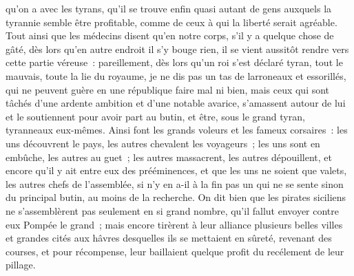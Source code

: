 \documentclass[french,twoside]{book} %
\begin{document}
qu’on a avec les tyrans, qu’il se trouve enfin quasi autant de gens auxquels la tyrannie semble être profitable, comme de ceux à qui la liberté serait agréable. Tout ainsi que les médecins disent qu’en notre corps, s’il y a quelque chose de gâté, dès lors qu’en autre endroit il s’y bouge rien, il se vient aussitôt rendre vers cette partie véreuse : pareillement, dès lors qu’un roi s’est déclaré tyran, tout le mauvais, toute la lie du royaume, je ne dis pas un tas de larroneaux et essorillés, qui ne peuvent guère en une république faire mal ni bien, mais ceux qui sont tâchés d’une ardente ambition et d’une notable avarice, s’amassent autour de lui et le soutiennent pour avoir part au butin, et être, sous le grand tyran, tyranneaux eux-mêmes. Ainsi font les grands voleurs et les fameux corsaires : les uns découvrent le pays, les autres chevalent les voyageurs ; les uns sont en embûche, les autres au guet ; les autres massacrent, les autres dépouillent, et encore qu’il y ait entre eux des prééminences, et que les uns ne soient que valets, les autres chefs de l’assemblée, si n’y en a-il à la fin pas un qui ne se sente sinon du principal butin, au moins de la recherche. On dit bien que les pirates siciliens ne s’assemblèrent pas seulement en si grand nombre, qu’il fallut envoyer contre eux Pompée le grand ; mais encore tirèrent à leur alliance plusieurs belles villes et grandes cités aux hâvres desquelles ils se mettaient en sûreté, revenant des courses, et pour récompense, leur baillaient quelque profit du recélement de leur pillage.\par
\end{document}
